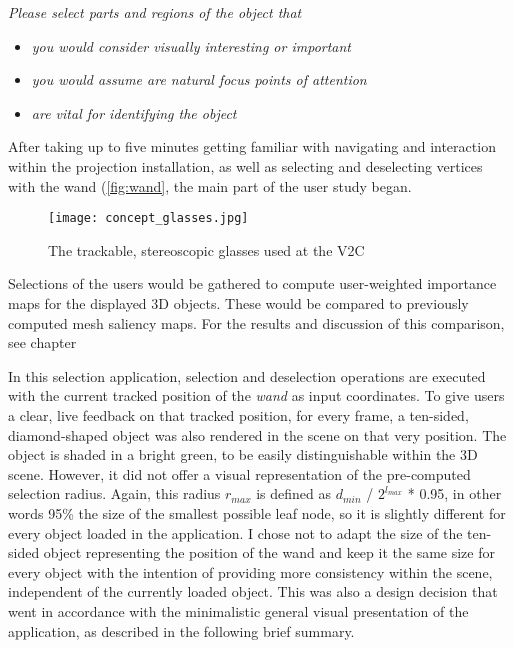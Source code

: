 \textit{Please select parts and regions of the object that}

\begin{itemize}
	\item \textit{you would consider visually interesting or important}
	\item \textit{you would assume are natural focus points of attention}
	\item \textit{are vital for identifying the object}
\end{itemize}

After taking up to five minutes getting familiar with navigating and interaction within the projection installation, as well as selecting and deselecting vertices with the wand (\ref{fig:wand}, the main part of the user study began. 

\begin{figure}[htb]
  \centering
  \texttt{[image: concept\_glasses.jpg]}\\ %
  \caption{The trackable, stereoscopic glasses used at the V2C}\label{fig:glasses}
\end{figure}

Selections of the users would be gathered to compute user-weighted importance maps for the displayed 3D objects. These would be compared to previously computed mesh saliency maps. For the results and discussion of this comparison, see chapter 

In this selection application, selection and deselection operations are executed with the current tracked position of the \textit{wand} as input coordinates. To give users a clear, live feedback on that tracked position, for every frame, a ten-sided, diamond-shaped object was also rendered in the scene on that very position. The object is shaded in a bright green, to be easily distinguishable within the 3D scene. However, it did not offer a visual representation of the pre-computed selection radius. Again, this radius $r_{max}$ is defined as $d_{min}$ / $2^{l_{max}}$ * 0.95, in other words 95\% the size of the smallest possible leaf node, so it is slightly different for every object loaded in the application. I chose not to adapt the size of the ten-sided object representing the position of the wand and keep it the same size for every object with the intention of providing more consistency within the scene, independent of the currently loaded object. This was also a design decision that went in accordance with the minimalistic general visual presentation of the application, as described in the following brief summary.

